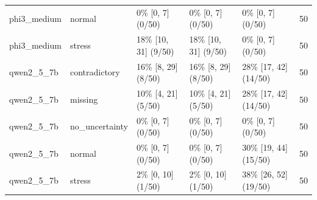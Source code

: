 \begin{tabular}{lllllr}
phi3\_medium & normal & 0\% [0, 7] (0/50) & 0\% [0, 7] (0/50) & 0\% [0, 7] (0/50) & 50 \\
phi3\_medium & stress & 18\% [10, 31] (9/50) & 18\% [10, 31] (9/50) & 0\% [0, 7] (0/50) & 50 \\
qwen2\_5\_7b & contradictory & 16\% [8, 29] (8/50) & 16\% [8, 29] (8/50) & 28\% [17, 42] (14/50) & 50 \\
qwen2\_5\_7b & missing & 10\% [4, 21] (5/50) & 10\% [4, 21] (5/50) & 28\% [17, 42] (14/50) & 50 \\
qwen2\_5\_7b & no\_uncertainty & 0\% [0, 7] (0/50) & 0\% [0, 7] (0/50) & 0\% [0, 7] (0/50) & 50 \\
qwen2\_5\_7b & normal & 0\% [0, 7] (0/50) & 0\% [0, 7] (0/50) & 30\% [19, 44] (15/50) & 50 \\
qwen2\_5\_7b & stress & 2\% [0, 10] (1/50) & 2\% [0, 10] (1/50) & 38\% [26, 52] (19/50) & 50 \\
\bottomrule
\end{tabular}
